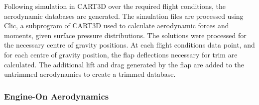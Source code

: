 		
		Following simulation in CART3D over the required flight conditions, the aerodynamic databases are generated. The simulation files are processed using Clic, a subprogram of CART3D used to calculate aerodynamic forces and moments, given surface pressure distributions. The solutions were processed for the necessary centre of gravity positions. At each flight conditions data point, and for each centre of gravity position, the flap deflections necessary for trim are calculated. The additional lift and drag generated by the flap are added to the untrimmed aerodynamics to create a trimmed database. 
		
		
		
		

		
		\subsubsection{Engine-On Aerodynamics}\label{sec:engine-on}
		
